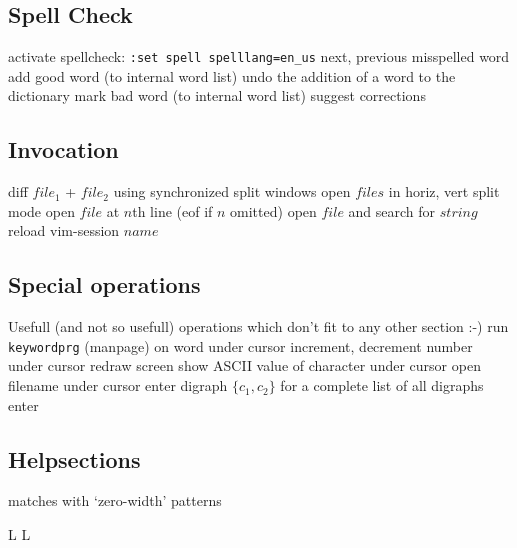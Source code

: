 \subsection{Spell Check}	{activate spellcheck: {\tt :set spell spelllang=en\_us}}
\cmdS{]s\ [s }	{next, previous misspelled word}
	{add good word (to internal word list)}
	{undo the addition of a word to the dictionary}
	{mark bad word (to internal word list)}
	{suggest corrections}

\subsection{Invocation}	{}
	{diff $file_1$ + $file_2$ using synchronized split windows}
	{open $files$ in horiz, vert split mode}
	{open $file$ at $n$th line (eof if $n$ omitted)}
	{open $file$ and search for $string$ }
	{reload vim-session $name$}

\subsection{Special operations}	{Usefull (and not so usefull) operations which don't fit to any other section :-)}
	{run {\tt keywordprg} (manpage) on word under cursor}
	{increment, decrement number under cursor}
	{redraw screen}
	{show A{\smallrm SCII} value of character under cursor}
	{open filename under cursor}
	{enter digraph $\{c_1,c_2\}$}
	{for a complete list of all digraphs enter}

\subsection{Helpsections}	{}
	{matches with `zero-width'  patterns}


\copyrightnotice


\vfil
\supereject
\if L\lr \else\null\vfill\eject\fi
\if L\lr \else\null\vfill\eject\fi
\bye

